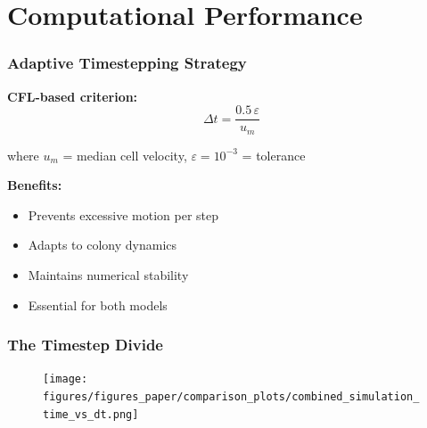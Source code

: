 \documentclass[10pt,t]{beamer}
\begin{document}
\section{Computational Performance}

\begin{frame}
    \frametitle{Adaptive Timestepping Strategy}

    \textbf{CFL-based criterion:}
    \begin{equation*}
        \Delta t = \frac{0.5 \, \varepsilon}{u_m}
    \end{equation*}

    where $u_m$ = median cell velocity, $\varepsilon = 10^{-3}$ = tolerance

    \vspace{0.5cm}

    \textbf{Benefits:}
    \begin{itemize}
        \item Prevents excessive motion per step
        \item Adapts to colony dynamics
        \item Maintains numerical stability
        \item Essential for both models
    \end{itemize}

\end{frame}

\begin{frame}
    \frametitle{The Timestep Divide}

    \begin{figure}
        \centering
        \texttt{[image: figures/figures\_paper/comparison\_plots/combined\_simulation\_time\_vs\_dt.png]}
    \end{figure}

\end{frame}
\end{document}
